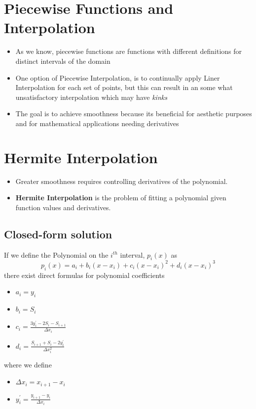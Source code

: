 \documentclass[twoside]{article}
\begin{document}
\section{Piecewise Functions and Interpolation}

\begin{itemize}
\item As we know, piecewise functions are functions with different definitions for distinct intervals of the domain
\item One option of Piecewise Interpolation, is to continually apply Liner Interpolation for each set of points, but this can result in an some what unsatisfactory interpolation which may have \textit{kinks}
\item The goal is to achieve smoothness because its beneficial for aesthetic purposes  and for mathematical applications needing derivatives 
\end{itemize}

\section{Hermite Interpolation}
\begin{itemize}
\item Greater smoothness requires controlling derivatives of the polynomial.
\item \textbf{Hermite Interpolation } is the problem of fitting a polynomial given function values and derivatives.
\end{itemize}

\subsection{Closed-form solution}
If we define the Polynomial on the \(i^{th}\) interval, \(p_i(x)\) as 
$$ p_i(x) = a_i + b_i (x - x_i) + c_i (x-x_i)^2 + d_i (x-x_i)^3$$
there exist direct formulas for polynomial coefficients
\begin{itemize}
\item $a_i = y_i$
\item $ b_i = S_i$
\item $c_i = \frac{3y_i^\prime - 2 S_i - S_{i+1}}{\Delta x_i}$
\item $d_i = \frac{S_{i+1} + S_i - 2 y_i^\prime}{\Delta x_i^2}$
\end{itemize}
where we define 
\begin{itemize}
\item \(\Delta x_i = x_{i+1} - x_i \)
\item \(y_i^\prime = \frac{y_{i+1} - y_i}{\Delta x_i}\)
\end{itemize}
\end{document}
